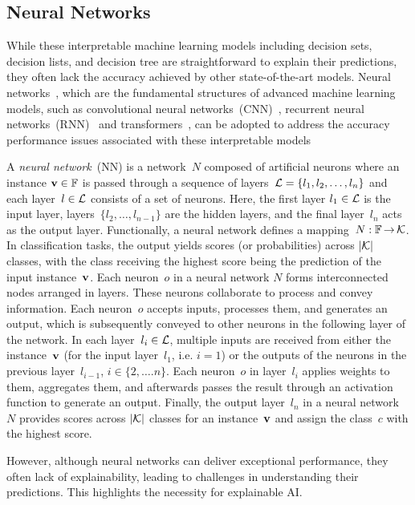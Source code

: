 \subsection{Neural Networks}
While these interpretable machine learning models including decision sets, 
decision lists, and decision tree are straightforward to explain their predictions, 
they often lack the accuracy achieved by other state-of-the-art models. 
%
Neural networks~\cite{schm-nn15}, which are the fundamental structures of 
advanced machine learning models, such as convolutional neural 
networks~(CNN)~\cite{kun-bc80,lbbh-ieee98}, recurrent neural
networks~(RNN)~\cite{elman-cs90} and transformers~\cite{transformer-17}, 
can be adopted to address the accuracy performance issues 
associated with these interpretable models

A \emph{neural network}~(NN) is a network~$N$ composed of
artificial neurons where an instance $\mathbf{v}\in\mathbb{F}$ is
passed through a sequence of layers~${\mathcal{L}} = \{l_1, l_2, \dots, l_n\}$
and each layer~$l\in{\mathcal{L}}$ consists of a set of neurons.
%
Here, the first layer $l_1 \in {\mathcal{L}}$ is the input layer, 
layers~$\{l_2, \dots, l_{n-1}\}$ are the hidden layers, and the final
layer~$l_n$ acts as the output layer.
%
Functionally, a neural network defines a mapping~$N: \mathbb{F} \operatorname*{\rightarrow} {\mathcal{K}}$.
%
In classification tasks, the output yields scores (or probabilities)
across $|{\mathcal{K}}|$ classes, with the class receiving the highest
score being the prediction of the input instance~$\mathbf{v}$.
%
Each neuron~$o$ in a neural network $N$ forms interconnected 
nodes arranged in layers. 
%
These neurons collaborate to process and convey information. 
%
Each neuron~$o$ accepts inputs, processes them, and generates an output, 
which is subsequently conveyed to other neurons in the following layer of 
the network.
%
In each layer~$l_i \in {\mathcal{L}}$, multiple inputs are received from either the 
instance~$\mathbf{v}$ (for the input layer~$l_1$, i.e. $i=1$) or
the outputs of the neurons in the previous layer~$l_{i-1}$,
$i \in \{2, \dots. n\}$.
%
Each neuron~$o$ in layer~$l_i$ applies weights to them, aggregates them, 
and afterwards passes the result through an activation function 
to generate an output.
%
Finally, the output layer~$l_n$ in a neural network~$N$ provides scores across 
$|{\mathcal{K}}|$ classes for an instance~$\mathbf{v}$ and assign the class~$c$
with the highest score.

However, although neural networks can deliver exceptional performance, they often lack 
of explainability, leading to challenges in understanding their predictions.
%
This highlights the necessity for explainable AI.
